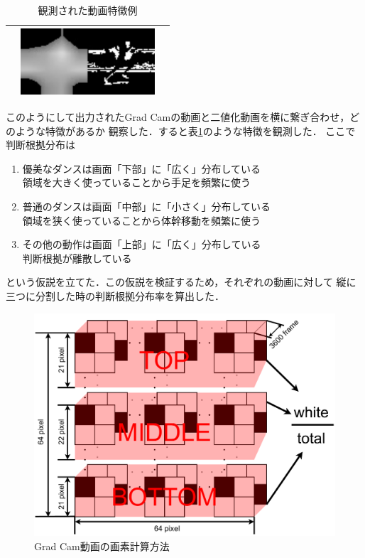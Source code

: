 \begin{table}[t]
\begin{center}
\begin{tabular}{|c|c|c|}
        & \includegraphics[width=50mm]{images/cam/running.png}
      \\ \hline
    \end{tabular}
  \end{center}
  \caption{観測された動画特徴例}
  \label{examples}
\end{table}

このようにして出力されたGrad Camの動画と二値化動画を横に繋ぎ合わせ，どのような特徴があるか
観察した．すると表\ref{examples}のような特徴を観測した．
ここで判断根拠分布は
\begin{enumerate}
  \item 優美なダンスは画面「下部」に「広く」分布している \\
        領域を大きく使っていることから手足を頻繁に使う
  \item 普通のダンスは画面「中部」に「小さく」分布している \\
        領域を狭く使っていることから体幹移動を頻繁に使う
  \item その他の動作は画面「上部」に「広く」分布している \\
        判断根拠が離散している
\end{enumerate}
という仮説を立てた．この仮説を検証するため，それぞれの動画に対して
縦に三つに分割した時の判断根拠分布率を算出した．
\clearpage

\begin{figure}[t]
  \begin{center}
    \includegraphics[width=120mm]{images/chart/divide.pdf}
  \end{center}
  \caption{Grad Cam動画の画素計算方法}
  \label{divide_graph}
\end{figure}

